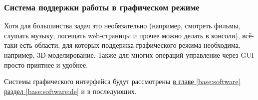 \subsubsection{Система поддержки работы в графическом режиме}\label{base:os:structure:additional:gui}
Хотя для большинства задач это необязательно (например, смотреть фильмы, слушать музыку, посещать web-страницы и прочее можно делать в консоли), всё-таки есть области, для которых поддержка графического режима необходима, например, 3D-моделирование. Также для многих операций управление через GUI просто приятнее и удобнее.

Системы графического интерфейса будут рассмотрены \hyperref[base:software:de]{в главе \ref*{base:software} раздел \ref*{base:software:de}} и в последующих.
